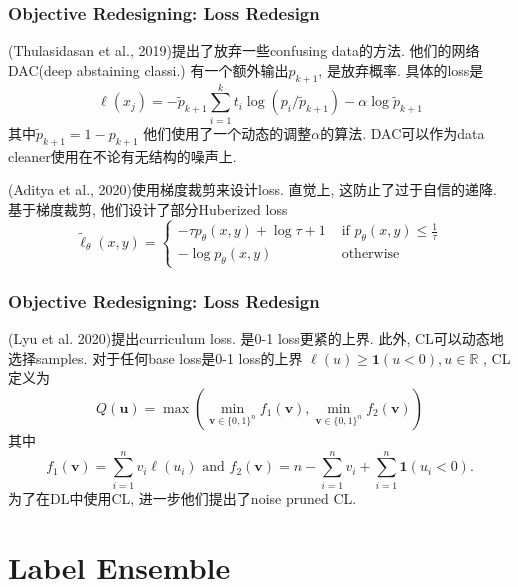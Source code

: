 \documentclass{beamer}
\begin{document}
\begin{frame}
    \frametitle{Objective Redesigning: Loss Redesign}

    (Thulasidasan et al., 2019)提出了放弃一些confusing data的方法. 他们的网络DAC(deep abstaining classi.) 有一个额外输出$p_{k+1}$, 是放弃概率. 具体的loss是
    \begin{equation}
        \ell\left(x_{j}\right)=-\tilde{p}_{k+1} \sum_{i=1}^{k} t_{i} \log \left(p_{i} / \tilde{p}_{k+1}\right)-\alpha \log \tilde{p}_{k+1}
    \end{equation}
    其中$\tilde{p}_{k+1}=1-p_{k+1}$
    他们使用了一个动态的调整$\alpha$的算法. 
    DAC可以作为data cleaner使用在不论有无结构的噪声上.

    (Aditya et al., 2020)使用梯度裁剪来设计loss. 直觉上, 这防止了过于自信的递降. 基于梯度裁剪, 他们设计了部分Huberized loss
    \begin{equation}
        \tilde{\ell}_{\theta}(x, y)=\left\{\begin{array}{ll}
        -\tau p_{\theta}(x, y)+\log \tau+1 & \text { if } p_{\theta}(x, y) \leq \frac{1}{\tau} \\
        -\log p_{\theta}(x, y) & \text { otherwise }
        \end{array}\right.
    \end{equation}

\end{frame}

\begin{frame}
    \frametitle{Objective Redesigning: Loss Redesign}

    (Lyu et al. 2020)提出curriculum loss. 是0-1 loss更紧的上界. 此外, CL可以动态地选择samples. 对于任何base loss是0-1 loss的上界
    $\ell(u)\ge \mathbf{1}(u<0), u \in \mathbb{R}$
    , CL定义为
    \begin{equation}
        Q(\mathbf{u})=\max \left(\min _{\mathbf{v} \in\{0,1\}^{n}} f_{1}(\mathbf{v}), \min _{\mathbf{v} \in\{0,1\}^{n}} f_{2}(\mathbf{v})\right)
    \end{equation}
    其中
    \begin{equation}
        f_{1}(\mathbf{v})=\sum_{i=1}^{n} v_{i} \ell\left(u_{i}\right) \text { and } f_{2}(\mathbf{v})=n-\sum_{i=1}^{n} v_{i}+\sum_{i=1}^{n} \mathbf{1}\left(u_{i}<0\right) .
    \end{equation}
    为了在DL中使用CL, 进一步他们提出了noise pruned CL.

\end{frame}

\section{Label Ensemble}
\end{document}
